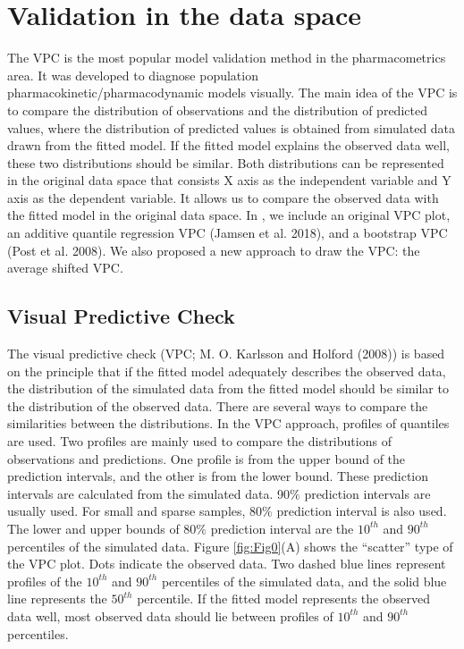\hypertarget{validation-in-the-data-space}{%
\section{Validation in the data space}\label{validation-in-the-data-space}}

The VPC is the most popular model validation method in the pharmacometrics area. It was developed to diagnose population pharmacokinetic/pharmacodynamic models visually.
The main idea of the VPC is to compare the distribution of observations and the distribution of predicted values, where the distribution of predicted values is obtained from simulated data drawn from the fitted model. If the fitted model explains the observed data well, these two distributions should be similar.
Both distributions can be represented in the original data space that consists X axis as the independent variable and Y axis as the dependent variable.
It allows us to compare the observed data with the fitted model in the original data space. In , we include an original VPC plot, an additive quantile regression VPC (Jamsen et al. 2018), and a bootstrap VPC (Post et al. 2008). We also proposed a new approach to draw the VPC: the average shifted VPC.

\hypertarget{visual-predictive-check}{%
\subsection{Visual Predictive Check}\label{visual-predictive-check}}

The visual predictive check (VPC; M. O. Karlsson and Holford (2008)) is based on the principle that if the fitted model adequately describes the observed data, the distribution of the simulated data from the fitted model should be similar to the distribution of the observed data. There are several ways to compare the similarities between the distributions. In the VPC approach, profiles of quantiles are used. Two profiles are mainly used to compare the distributions of observations and predictions. One profile is from the upper bound of the prediction intervals, and the other is from the lower bound. These prediction intervals are calculated from the simulated data. 90\(\%\) prediction intervals are usually used. For small and sparse samples, 80\(\%\) prediction interval is also used. The lower and upper bounds of 80\(\%\) prediction interval are the \(10^{th}\) and \(90^{th}\) percentiles of the simulated data. Figure \ref{fig:Fig0}(A) shows the ``scatter'' type of the VPC plot. Dots indicate the observed data. Two dashed blue lines represent profiles of the \(10^{th}\) and \(90^{th}\) percentiles of the simulated data, and the solid blue line represents the \(50^{th}\) percentile. If the fitted model represents the observed data well, most observed data should lie between profiles of \(10^{th}\) and \(90^{th}\) percentiles.

